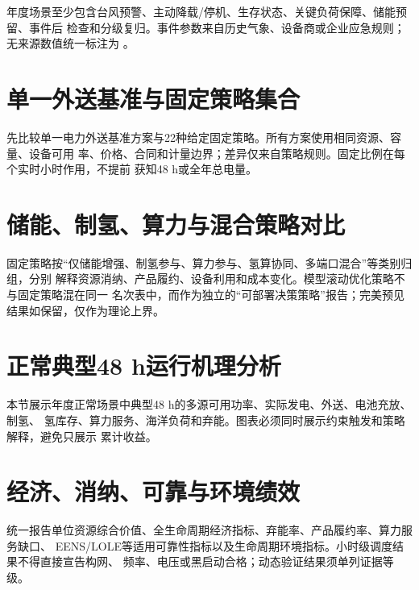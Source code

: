 年度场景至少包含台风预警、主动降载/停机、生存状态、关键负荷保障、储能预留、事件后
检查和分级复归。事件参数来自历史气象、设备商或企业应急规则；无来源数值统一标注为
\assumptiontag。


\section{单一外送基准与固定策略集合}

先比较单一电力外送基准方案与22种给定固定策略。所有方案使用相同资源、容量、设备可用
率、价格、合同和计量边界；差异仅来自策略规则。固定比例在每个实时小时作用，不提前
获知48 h或全年总电量。


\section{储能、制氢、算力与混合策略对比}

固定策略按“仅储能增强、制氢参与、算力参与、氢算协同、多端口混合”等类别归组，分别
解释资源消纳、产品履约、设备利用和成本变化。模型滚动优化策略不与固定策略混在同一
名次表中，而作为独立的“可部署决策策略”报告；完美预见结果如保留，仅作为理论上界。


\section{正常典型48 h运行机理分析}

本节展示年度正常场景中典型48 h的多源可用功率、实际发电、外送、电池充放、制氢、
氢库存、算力服务、海洋负荷和弃能。图表必须同时展示约束触发和策略解释，避免只展示
累计收益。


\section{经济、消纳、可靠与环境绩效}

统一报告单位资源综合价值、全生命周期经济指标、弃能率、产品履约率、算力服务缺口、
EENS/LOLE等适用可靠性指标以及生命周期环境指标。小时级调度结果不得直接宣告构网、
频率、电压或黑启动合格；动态验证结果须单列证据等级。

